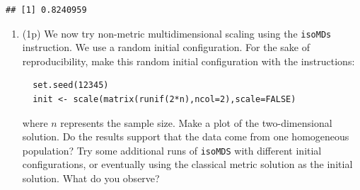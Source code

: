 \documentclass[
]{article}
\newenvironment{Shaded}{\begin{snugshade}}{\end{snugshade}}
\newcommand{\DataTypeTok}[1]{\textcolor[rgb]{0.13,0.29,0.53}{#1}}
\newcommand{\DecValTok}[1]{\textcolor[rgb]{0.00,0.00,0.81}{#1}}
\newcommand{\KeywordTok}[1]{\textcolor[rgb]{0.13,0.29,0.53}{\textbf{#1}}}
\newcommand{\NormalTok}[1]{#1}
\newcommand{\OperatorTok}[1]{\textcolor[rgb]{0.81,0.36,0.00}{\textbf{#1}}}
\newcommand{\OtherTok}[1]{\textcolor[rgb]{0.56,0.35,0.01}{#1}}
\newcommand{\StringTok}[1]{\textcolor[rgb]{0.31,0.60,0.02}{#1}}
\providecommand{\tightlist}{%
  \setlength{\itemsep}{0pt}\setlength{\parskip}{0pt}}
\begin{document}
\begin{Shaded}
\end{Shaded}

\begin{verbatim}
## [1] 0.8240959
\end{verbatim}

\begin{enumerate}
\def\labelenumi{\arabic{enumi}.}
\setcounter{enumi}{8}
\tightlist
\item
  (1p) We now try non-metric multidimensional scaling using the
  \texttt{isoMDs} instruction. We use a random initial configuration.
  For the sake of reproducibility, make this random initial
  configuration with the instructions:

  \begin{verbatim}
  set.seed(12345)
  init <- scale(matrix(runif(2*n),ncol=2),scale=FALSE)
  \end{verbatim}

  where \(n\) represents the sample size. Make a plot of the
  two-dimensional solution. Do the results support that the data come
  from one homogeneous population? Try some additional runs of
  \texttt{isoMDS} with different initial configurations, or eventually
  using the classical metric solution as the initial solution. What do
  you observe?
\end{enumerate}

\begin{Shaded}
\end{Shaded}
\end{document}
